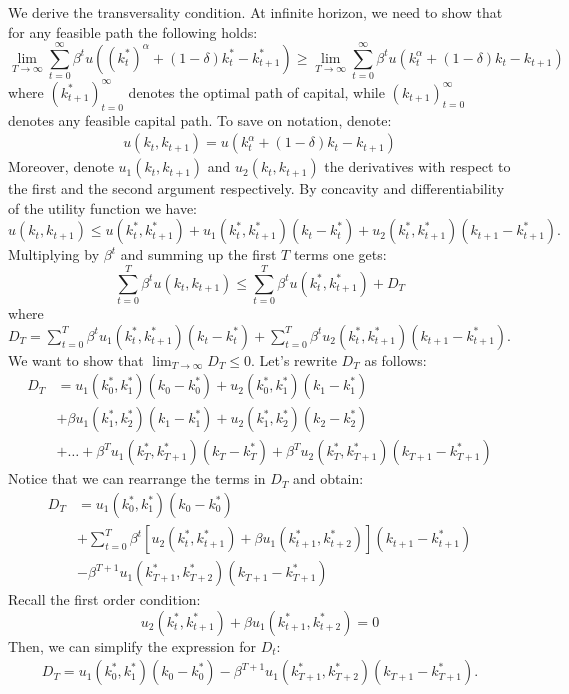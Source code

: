 \documentclass[dvipsnames,11pt]{article}
\begin{document}
                \begin{solution}
We derive the transversality condition. At infinite horizon, we need to show that for any feasible path the following holds:
\[
\lim_{T\to \infty } \sum_{t=0}^\infty \beta^tu((k_t^*)^\alpha +(1-\delta)k_t^*-k_{t+1}^*) \geq \lim_{T\to \infty } \sum_{t=0}^\infty \beta^tu(k_t^\alpha +(1-\delta)k_t-k_{t+1})
\]
where $(k_{t+1}^*)_{t=0}^\infty$ denotes the optimal path of capital, while $(k_{t+1})_{t=0}^\infty$ denotes any feasible capital path. To save on notation, denote:
\begin{align*}
    u(k_t,k_{t+1})=u(k_t^\alpha +(1-\delta)k_t-k_{t+1}) 
\end{align*}
Moreover, denote $u_{1}(k_t,k_{t+1})$ and $u_{2}(k_t,k_{t+1})$ the derivatives with respect to the first and the second argument respectively. By concavity and differentiability of the utility function we have:
\[
u(k_t,k_{t+1})\leq u(k_t^*,k_{t+1}^*)+u_{1}(k_t^*,k_{t+1}^*)(k_t-k_t^*)+u_{2}(k_t^*,k_{t+1}^*)(k_{t+1}-k_{t+1}^*).
\]
Multiplying by $\beta^t$ and summing up the first $T$ terms one gets:
\[
\sum_{t=0}^T \beta^tu(k_t,k_{t+1})\leq \sum_{t=0}^T \beta^tu(k^*_t,k_{t+1}^*)+D_T
\]
where $D_T=\sum_{t=0}^T\beta^tu_{1}(k_{t}^*,k_{t+1}^*)(k_t-k_{t}^*)+\sum_{t=0}^T\beta^tu_2(k_{t}^*,k_{t+1}^*)(k_{t+1}-k_{t+1}^*)$. \\
We want to show that $\lim_{T\to \infty}D_T\leq 0$. Let's rewrite $D_T$ as follows:
\begin{align*}
    D_T&=u_{1}(k_0^*,k_1^*)(k_0-k_0^*)+u_{2}(k_0^*,k_1^*)(k_1-k_1^*) \\
    &+\beta u_{1}(k_1^*,k_2^*)(k_1-k_1^*)+u_{2}(k_1^*,k_2^*)(k_2-k_2^*)\\
    & + \dots + \beta^Tu_{1}(k_T^*,k_{T+1}^*)(k_{T}-k_{T}^*)+\beta^Tu_{2}(k_T^*,k_{T+1}^*)(k_{T+1}-k_{T+1}^*)
\end{align*}
Notice that we can rearrange the terms in $D_T$ and obtain:
\begin{align*}
D_T&=u_1(k_0^*,k_1^*)(k_0-k_0^*)\\&+\sum_{t=0}^T\beta^t[u_2(k_t^*,k_{t+1}^*)+\beta u_1(k_{t+1}^*,k_{t+2}^*)](k_{t+1}-k_{t+1}^*)\\&-\beta^{T+1} u_1(k_{T+1}^*,k_{T+2}^*)(k_{T+1}-k_{T+1}^*)
\end{align*}
Recall the first order condition:
\[
u_{2}(k_t^*,k_{t+1}^*)+\beta u_{1}(k_{t+1}^*,k_{t+2}^*)=0
\]
Then, we can simplify the expression for $D_t$:
\begin{align*}
    D_T=u_{1}(k_0^*,k_1^*)(k_0-k_0^*)-\beta^{T+1} u_{1}(k_{T+1}^*,k_{T+2}^*)(k_{T+1}-k_{T+1}^*).

\end{align*}
\end{solution}
\end{document}
